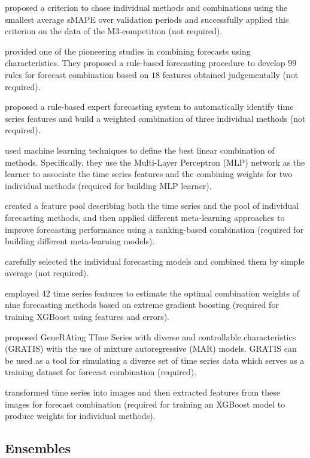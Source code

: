 \documentclass[11pt]{article}
\begin{document}
\cite{hibon2005combine} proposed a criterion to chose individual methods and combinations using the smallest average sMAPE over validation periods and successfully applied this criterion on the data of the M3-competition (not required).

\cite{collopy1992rule} provided one of the pioneering studies in combining forecasts using characteristics. They proposed a rule-based forecasting procedure to develop $99$ rules for forecast combination based on $18$ features obtained judgementally (not required).

\cite{vokurka1996automatic} proposed a rule-based expert forecasting system to automatically identify time series features and build a weighted combination of three individual methods (not required).

\cite{prudencio2004using} used machine learning techniques to define the best linear combination of methods. Specifically, they use the Multi-Layer Perceptron (MLP) network as the learner to associate the time series features and the combining weights for two individual methods (required for building MLP learner).

\cite{lemke2010meta} created a feature pool describing both the time series and the pool of individual forecasting methods, and then applied different meta-learning approaches to improve forecasting performance using a ranking-based combination (required for building different meta-learning models).

\cite{andrawis2011forecast} carefully selected the individual forecasting models and combined them by simple average (not required).

\cite{montero2020fforma} employed 42 time series features to estimate the optimal combination weights of nine forecasting methods based on extreme gradient boosting (required for training XGBoost using features and errors).

\cite{kang2020gratis} proposed GeneRAting TIme Series with diverse and controllable characteristics (GRATIS) with the use of mixture autoregressive (MAR) models. GRATIS can be used as a tool for simulating a diverse set of time series data which serves as a training dataset for forecast combination (required).

\cite{li2020forecasting} transformed time series into images and then extracted features from these images for forecast combination (required for training an XGBoost model to produce weights for individual methods).


\subsection{Ensembles}
\end{document}
